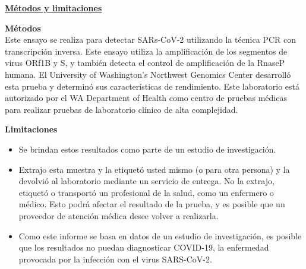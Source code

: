 \documentclass[10pt]{article}
\begin{document}
\bigskip

\large \underline{\textbf{Métodos y limitaciones}}

\textbf{Métodos}\\
Este ensayo se realiza para detectar SARs-CoV-2 utilizando la técnica PCR con
transcripción inversa. Este ensayo utiliza la amplificación de los segmentos de
virus ORf1B y S, y también detecta el control de amplificación de la RnaseP
humana. El University of Washington’s Northwest Genomics Center desarrolló esta
prueba y determinó sus características de rendimiento. Este laboratorio está
autorizado por el WA Department of Health como centro de pruebas médicas para
realizar pruebas de laboratorio clínico de alta complejidad.

\textbf{Limitaciones}

\begin{itemize}

\item

  Se brindan estos resultados como parte de un estudio de investigación.

\item

  Extrajo esta muestra y la etiquetó usted mismo (o para otra persona) y la
  devolvió al laboratorio mediante un servicio de entrega. No la extrajo,
  etiquetó o transportó un profesional de la salud, como un enfermero o médico.
  Esto podrá afectar el resultado de la prueba, y es posible que un proveedor de
  atención médica desee volver a realizarla.

\item

  Como este informe se basa en datos de un estudio de investigación, es posible
  que los resultados no puedan diagnosticar COVID-19, la enfermedad provocada
  por la infección con el virus SARS-CoV-2.

\end{itemize}
\end{document}
